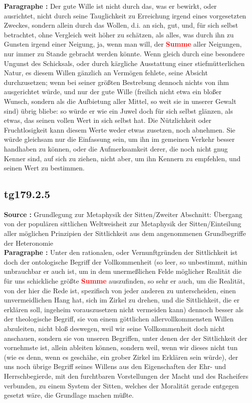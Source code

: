 \documentclass[a4paper,12pt,twoside]{book}
\newcommand{\match}[1]{\textcolor{red}{\textbf{#1}}}
\begin{document}
	\noindent\textbf{Paragraphe : }Der gute Wille ist nicht durch das, was er bewirkt, oder ausrichtet, nicht durch seine Tauglichkeit zu Erreichung irgend eines vorgesetzten Zweckes, sondern allein durch das Wollen, d.i. an sich, gut, und, für sich selbst betrachtet, ohne Vergleich weit höher zu schätzen, als alles, was durch ihn zu Gunsten irgend einer Neigung, ja, wenn man will, der \match{Summe} aller Neigungen, nur immer zu Stande gebracht werden könnte. Wenn gleich durch eine besondere Ungunst des Schicksals, oder durch kärgliche Ausstattung einer stiefmütterlichen Natur, es diesem Willen gänzlich an Vermögen fehlete, seine Absicht durchzusetzen; wenn bei seiner größten Bestrebung dennoch nichts von ihm ausgerichtet würde, und nur der gute Wille (freilich nicht etwa ein bloßer Wunsch, sondern als die Aufbietung aller Mittel, so weit sie in unserer Gewalt sind) übrig bliebe: so würde er wie ein Juwel doch für sich selbst glänzen, als etwas, das seinen vollen Wert in sich selbst hat. Die Nützlichkeit oder Fruchtlosigkeit kann diesem Werte weder etwas zusetzen, noch abnehmen. Sie würde gleichsam nur die Einfassung sein, um ihn im gemeinen Verkehr besser handhaben zu können, oder die Aufmerksamkeit derer, die noch nicht gnug Kenner sind, auf sich zu ziehen, nicht aber, um ihn Kennern zu empfehlen, und seinen Wert zu bestimmen. 
	
	\subsection*{tg179.2.5} 
	\textbf{Source : }Grundlegung zur Metaphysik der Sitten/Zweiter Abschnitt: Übergang von der populären sittlichen Weltweisheit zur Metaphysik der Sitten/Einteilung aller möglichen Prinzipien der Sittlichkeit aus dem angenommenen Grundbegriffe der Heteronomie\\  
	
	\noindent\textbf{Paragraphe : }Unter den rationalen, oder Vernunftgründen der Sittlichkeit ist doch der ontologische Begriff der Vollkommenheit (so leer, so unbestimmt, mithin unbrauchbar er auch ist, um in dem unermeßlichen Felde möglicher Realität  die für uns schickliche größte \match{Summe} auszufinden, so sehr er auch, um die Realität, von der hier die Rede ist, spezifisch von jeder anderen zu unterscheiden, einen unvermeidlichen Hang hat, sich im Zirkel zu drehen, und die Sittlichkeit, die er erklären soll, ingeheim vorauszusetzen nicht vermeiden kann) dennoch besser als der theologische Begriff, sie von einem göttlichen allervollkommensten Willen abzuleiten, nicht bloß deswegen, weil wir seine Vollkommenheit doch nicht anschauen, sondern sie von unseren Begriffen, unter denen der der Sittlichkeit der vornehmste ist, allein ableiten können, sondern weil, wenn wir dieses nicht tun (wie es denn, wenn es geschähe, ein grober Zirkel im Erklären sein würde), der uns noch übrige Begriff seines Willens aus den Eigenschaften der Ehr- und Herrschbegierde, mit den furchtbaren Vorstellungen der Macht und des Racheifers verbunden, zu einem System der Sitten, welches der Moralität gerade entgegen gesetzt wäre, die Grundlage machen müßte. 
	
\end{document}
